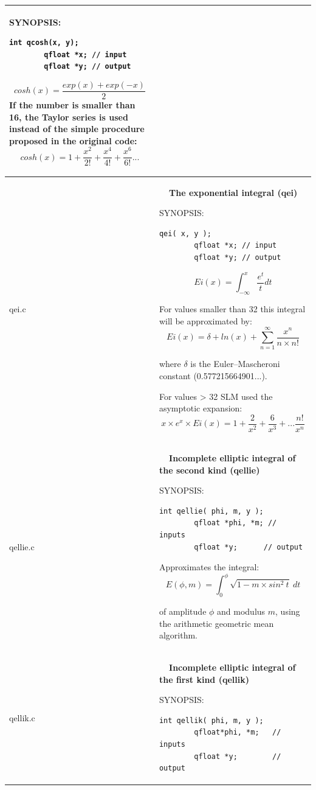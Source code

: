 \documentclass[10pt,a4paper,x11names]{memoir} %
\newcounter{entry}
\newcommand{\TOC}[1] {\addcontentsline{toc}{section}{\theentry\ \  #1} \textbf{\theentry\ \  #1} \par\stepcounter{entry}}
\begin{document}
\begin{longtable}{|p{1.5cm}|p{11.5cm}|}
	{\footnotesize SYNOPSIS:}\vspace{-0.2cm}
	\begin{lstlisting}[numbers=none]
		int qcosh(x, y);
		qfloat *x; // input
		qfloat *y; // output
	\end{lstlisting}\vspace{-0.2cm}
	$$cosh(x)=\frac{exp(x)+exp(-x)}{2}$$
	If the number is smaller than 16, the Taylor series is used instead of the simple procedure proposed in the original code:
	$$ cosh(x)=1+\frac{x^2}{2!}+\frac{x^4}{4!}+\frac{x^6}{6!}...$$
	\\\hline
	qei.c& 	\TOC{The exponential integral (qei)}
	
	{\footnotesize SYNOPSIS:}\vspace{-0.2cm}\index{qei}
	\begin{lstlisting}[numbers=none]
		qei( x, y );
		qfloat *x; // input
		qfloat *y; // output
	\end{lstlisting}\vspace{-0.2cm}
	$$Ei(x) = \int_{-\infty}^{x}\frac{e^t}{t} dt$$
	
	For values smaller than 32 this integral will be approximated by:
	$$Ei(x) = \delta + ln(x) + \sum_{n=1}^{\infty} \frac{x^n}{n \times n!}$$
	
	where $\delta$ is the  Euler–Mascheroni constant (0.577215664901...).
	
	For values > 32 SLM used the asymptotic expansion:
	$$x \times e^x \times Ei(x) = 1+\frac{2}{x^2}+\frac{6}{x^3} + ... \frac{n!}{x^n}$$
	\\\hline
	qellie.c&\TOC{Incomplete elliptic integral of the second kind (qellie)}
	
	{\footnotesize SYNOPSIS:}\vspace{-0.2cm}\index{qellie}
	\begin{lstlisting}[numbers=none]
		int qellie( phi, m, y );
		qfloat *phi, *m; // inputs
		qfloat *y;      // output
	\end{lstlisting}\vspace{-0.2cm}
	 Approximates the integral:
	$$ E(\phi,m) = \int_{0}^{\phi}\sqrt{1-m\times sin^2 \ t}\ dt $$
	
	of amplitude $\phi$ and modulus  $m$, using the arithmetic geometric mean algorithm.
	\\\hline
	qellik.c&\TOC{Incomplete elliptic integral of the first kind (qellik)}\index{qellik}
	{\footnotesize SYNOPSIS:}\vspace{-0.2cm}\index{ellik}
	\begin{lstlisting}[numbers=none]
		int qellik( phi, m, y );
		qfloat*phi, *m;   // inputs
		qfloat *y;        // output
	\end{lstlisting}\vspace{-0.2cm}
	

\end{longtable}
\end{document}
